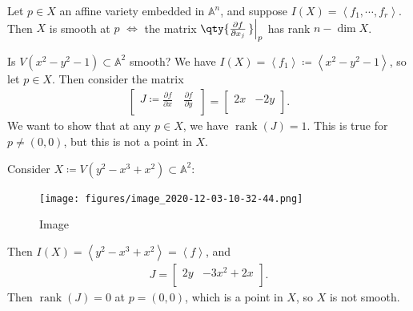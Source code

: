 \begin{proposition}

Let \(p\in X\) an affine variety embedded in \({\mathbb{A}}^n\), and
suppose \(I(X) = \left\langle{f_1, \cdots, f_r}\right\rangle\). Then
\(X\) is smooth at \(p\) \(\iff\) the matrix
\(\qty{{\frac{\partial f}{\partial x_j}\,}}\Big|_{p}\) has rank
\(n - \dim X\).

\end{proposition}

\begin{example}[?]

Is \(V(x^2 - y^2 - 1) \subset {\mathbb{A}}^2\) smooth? We have
\(I(X) = \left\langle{f_1}\right\rangle \coloneqq\left\langle{x^2 - y^2 - 1}\right\rangle\),
so let \(p\in X\). Then consider the matrix
\begin{align*}  
\begin{bmatrix}
J \coloneqq
{\frac{\partial f}{\partial x}\,} & {\frac{\partial f}{\partial y}\,} \\
\end{bmatrix} = 
\begin{bmatrix}
2x & -2y \\
\end{bmatrix}
.\end{align*}
We want to show that at any \(p\in X\), we have
\(\operatorname{rank}(J) = 1\). This is true for \(p\neq (0, 0)\), but
this is not a point in \(X\).

\end{example}

\begin{example}[?]

Consider \(X \coloneqq V(y^2 - x^3 + x^2) \subset {\mathbb{A}}^2\):

\begin{figure}
\centering
\texttt{[image: figures/image\_2020-12-03-10-32-44.png]}
\caption{Image}
\end{figure}

Then
\(I(X) = \left\langle{y^2 - x^3 + x^2}\right\rangle = \left\langle{f}\right\rangle\),
and
\begin{align*}  
J = 
\begin{bmatrix}
2y & -3x^2 + 2x \\
\end{bmatrix}
.\end{align*}
Then \(\operatorname{rank}(J) = 0\) at \(p = (0, 0)\), which is a point
in \(X\), so \(X\) is not smooth.

\end{example}

